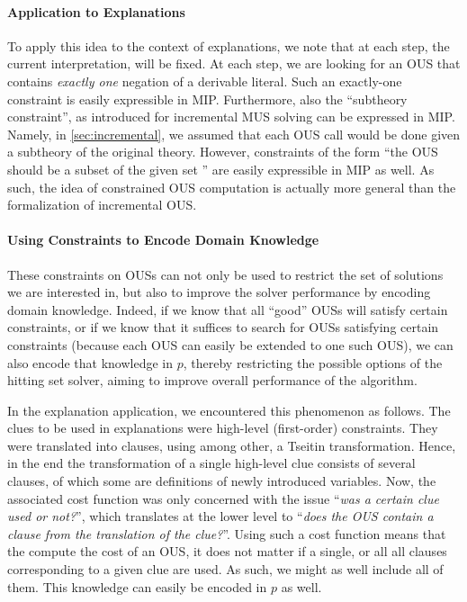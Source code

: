 \paragraph{Application to Explanations}
To apply this idea to the context of explanations, we note that at each step, the current interpretation, will be fixed. 
At each step, we are looking for an OUS that contains \emph{exactly one} negation of a derivable literal. 
Such an exactly-one constraint is easily expressible in MIP.
Furthermore, also the ``subtheory constraint'', as introduced for incremental MUS solving can be expressed in MIP. Namely, in \cref{sec:incremental}, we assumed that each OUS call would be done given a subtheory of the original theory. However, constraints of the form ``the OUS should be a subset of the given set \formula'' are easily expressible in MIP as well. 
As such, the idea of constrained OUS computation is actually more general than the formalization of incremental OUS. 


\paragraph{Using Constraints to Encode Domain Knowledge}
These constraints on OUSs can not only be used to restrict the set of solutions we are interested in, but also to improve the solver performance by encoding domain knowledge.
Indeed, if we know that all ``good'' OUSs will satisfy certain constraints, or if we know that it suffices to search for OUSs satisfying certain constraints (because each OUS can easily be extended to one such OUS),  we can also encode that knowledge in $p$, thereby restricting the possible options of the hitting set solver, aiming to improve overall performance of the algorithm. 

In the explanation application, we encountered this phenomenon as follows. 
The clues to be used in explanations were high-level (first-order) constraints. They were translated into clauses, using among other, a Tseitin transformation.
Hence, in the end the transformation of a single high-level clue consists of several clauses, of which some are definitions of newly introduced variables. 
Now, the associated cost function was only concerned with the issue ``\emph{was a certain clue used or not?}'', which translates at the lower level to ``\emph{does the OUS contain a clause from the translation of the clue?}''.
Using such a cost function means that the compute the cost of an OUS, it does not matter if a single, or all all clauses corresponding to a given clue are used. As such, we might as well include all of them. This knowledge can easily be encoded in $p$ as well. 


